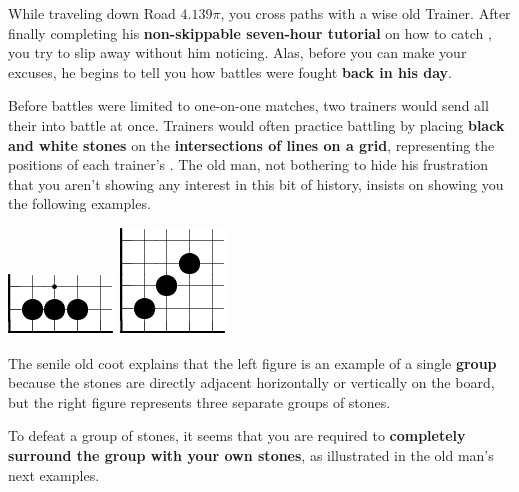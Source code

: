 

While traveling down Road \(4.139\pi\),
you cross paths with a wise old \mappMobimon{} Trainer. After finally
completing his
\textbf{non-skippable seven-hour tutorial} on how to catch \mappMobimon{},
you try to slip away without him noticing. Alas, before you can make your
excuses, he begins to tell you how \mappMobimon{} battles were fought
\textbf{back in his day}.

Before \mappMobimon{} battles were limited to one-on-one matches,
two trainers would send all their \mappMobimon{} into battle at once. Trainers
would often practice battling by placing \textbf{black and white stones}
on the \textbf{intersections of lines on a grid}, representing the positions
of each trainer's \mappMobimon{}. The old man,
not bothering to hide his frustration that you aren't showing any
interest in this bit of history, insists on showing you the following examples.

\begin{center}
  \includegraphics{gogetem/assets/explanation1-crop}
  \includegraphics{gogetem/assets/explanation2-crop}
\end{center}

The senile old coot explains that the left figure is an example of a single
\textbf{group} because the stones are directly adjacent horizontally
or vertically on the board, but the right figure represents
three separate groups of stones.

To defeat a group of stones, it seems that you are required to
\textbf{completely surround the group with your own stones}, as illustrated
in the old man's next examples.


